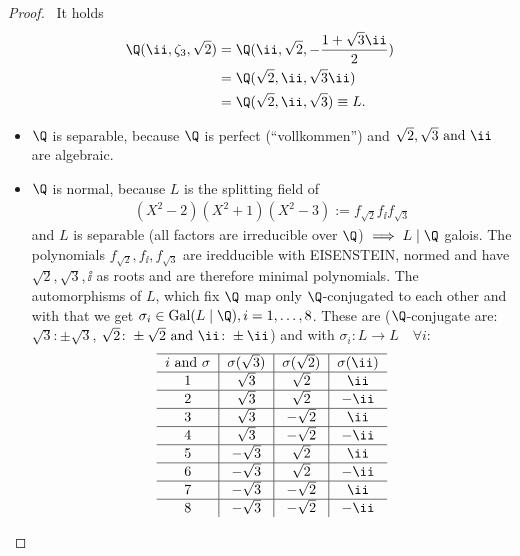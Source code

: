 \begin{proof}\
	It holds
	\begin{align*}
		\Q(\ii, \zeta_3, \sqrt{2}) &= \Q(\ii, \sqrt{2}, - \frac{1+\sqrt{3}\ii}{2})\\
		&= \Q(\sqrt{2}, \ii, \sqrt{3}\ii)\\
		&= \Q(\sqrt{2}, \ii, \sqrt{3}) \equiv L. 
	\end{align*}
	\begin{itemize}
		\item $\Q$ is separable, because $\Q$ is perfect (``vollkommen'') and $\sqrt{2}, \sqrt{3} \and \ii$ are algebraic.
		\item $\Q$ is normal, because $L$ is the splitting field of
		\begin{align*}
			(X^2 -2)(X^2+1)(X^2-3) := f_{\sqrt{2}}f_{\ii}f_{\sqrt{3}}
		\end{align*}
		and $L$ is separable (all factors are irreducible over $\Q$) $\implies L \mid \Q$ galois. The polynomials $f_{\sqrt{2}},f_{\ii},f_{\sqrt{3}}$ are iredducible with EISENSTEIN, normed and have $\sqrt{2},\sqrt{3}, \ii$ as roots and are therefore minimal polynomials. The automorphisms of $L$, which fix $\Q$ map only $\Q$-conjugated to each other and with that we get $\sigma_i \in \Gal(L\mid \Q), i =1,\dots,8$. These are ($\Q$-conjugate are: $\sqrt{3}\colon \pm \sqrt{3}$, $\sqrt{2}\colon \pm \sqrt{2} \and \ii\colon \pm \ii$) and with $\sigma_i: L \to L \quad \forall i$:
		\begin{align*}
			\begin{tabular}{c|c|c|c}
			\hline
			$i \and \sigma$               & $\sigma(\sqrt{3})$             & $\sigma(\sqrt{2})$              & $\sigma(\ii)$\\ 
			\hline 
			1 & $\sqrt{3}$ & $\sqrt{2}$ & $\ii$ \\ %
			\hline
			2 & $\sqrt{3}$ & $\sqrt{2}$ & $-\ii$\\
			\hline
			3 & $\sqrt{3}$ & $-\sqrt{2}$ & $\ii$\\
			\hline
			4 & $\sqrt{3}$ & $-\sqrt{2}$ & $-\ii$\\
			\hline
			5 & $-\sqrt{3}$ & $\sqrt{2}$ & $\ii$\\
			\hline
			6 & $-\sqrt{3}$ & $\sqrt{2}$ & $-\ii$\\
			\hline
			7 & $-\sqrt{3}$ & $-\sqrt{2}$ & $\ii$ \\
			\hline
			8 & $-\sqrt{3}$ & $-\sqrt{2}$ & $-\ii$ \\     
			\end{tabular}

\end{align*}
\end{itemize}
\end{proof}

